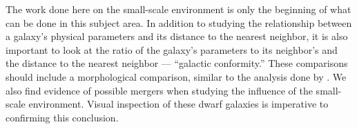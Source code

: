 
The work done here on the small-scale environment is only the beginning of what 
can be done in this subject area.  In addition to studying the relationship 
between a galaxy's physical parameters and its distance to the nearest neighbor, 
it is also important to look at the ratio of the galaxy's parameters to its 
neighbor's and the distance to the nearest neighbor --- ``galactic 
conformity.''  These comparisons should include a morphological comparison, 
similar to the analysis done by \cite{Park09}.  We also find evidence of 
possible mergers when studying the influence of the small-scale environment.  
Visual inspection of these dwarf galaxies is imperative to confirming this 
conclusion.